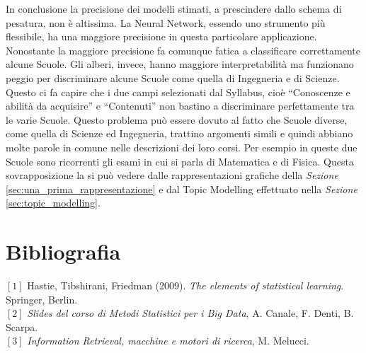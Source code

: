 \documentclass[10pt,a4paper,twoside]{tau-book}
\begin{document}
In conclusione la precisione dei modelli stimati, a prescindere dallo schema di pesatura, non è altissima. La Neural Network, essendo uno strumento più flessibile, ha una maggiore precisione in questa particolare applicazione. Nonostante la maggiore precisione fa comunque fatica a classificare correttamente alcune Scuole. Gli alberi, invece, hanno maggiore interpretabilità ma funzionano peggio per discriminare alcune Scuole come quella di Ingegneria e di Scienze.
Questo ci fa capire che i due campi selezionati dal Syllabus, cioè “Conoscenze e abilità da acquisire” e “Contenuti” non bastino a discriminare perfettamente tra le varie Scuole. Questo problema può essere dovuto al fatto che Scuole diverse, come quella di Scienze ed Ingegneria, trattino argomenti simili e quindi abbiano molte parole in comune nelle descrizioni dei loro corsi. Per esempio in queste due Scuole sono ricorrenti gli esami in cui si parla di Matematica e di Fisica. Questa sovrapposizione la si può vedere dalle rappresentazioni grafiche della \textit{Sezione} \ref{sec:una_prima_rappresentazione} e dal Topic Modelling effettuato nella \textit{Sezione} \ref{sec:topic_modelling}.

\section{Bibliografia}

$[1]$ Hastie, Tibshirani, Friedman (2009). \textit{The elements of statistical learning}. Springer, Berlin. \\ $[2]$ \textit{Slides del corso di Metodi Statistici per i Big Data},  A. Canale, F. Denti, B. Scarpa. \\ $[3]$ \textit{Information Retrieval, macchine e motori di ricerca},  M. Melucci.
\end{document}
